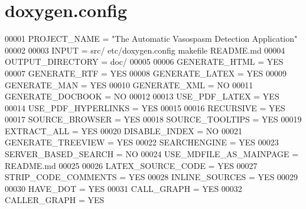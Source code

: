 \hypertarget{doxygen_8config_source}{\section{doxygen.\+config}
\label{doxygen_8config_source}
}

\begin{DoxyCode}
00001 PROJECT\_NAME = "The Automatic Vasospasm Detection Application"
00002 
00003 INPUT = src/ etc/doxygen.config makefile README.md
00004 OUTPUT\_DIRECTORY = doc/
00005 
00006 GENERATE\_HTML = YES
00007 GENERATE\_RTF = YES
00008 GENERATE\_LATEX = YES
00009 GENERATE\_MAN = YES
00010 GENERATE\_XML = NO
00011 GENERATE\_DOCBOOK = NO
00012 
00013 USE\_PDF\_LATEX = YES
00014 USE\_PDF\_HYPERLINKS = YES
00015 
00016 RECURSIVE = YES
00017 SOURCE\_BROWSER = YES
00018 SOURCE\_TOOLTIPS = YES
00019 EXTRACT\_ALL = YES
00020 DISABLE\_INDEX = NO
00021 GENERATE\_TREEVIEW = YES
00022 SEARCHENGINE = YES
00023 SERVER\_BASED\_SEARCH = NO
00024 USE\_MDFILE\_AS\_MAINPAGE = README.md
00025 
00026 LATEX\_SOURCE\_CODE = YES
00027 STRIP\_CODE\_COMMENTS = YES
00028 INLINE\_SOURCES = YES
00029 
00030 HAVE\_DOT = YES
00031 CALL\_GRAPH = YES
00032 CALLER\_GRAPH = YES
\end{DoxyCode}
